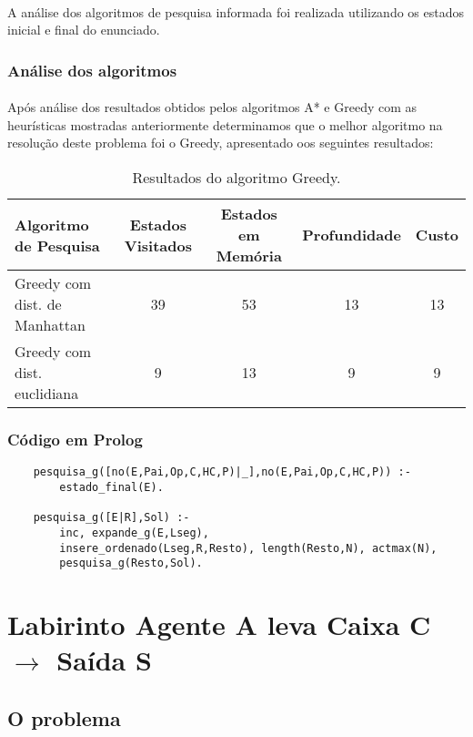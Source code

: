 \documentclass{article}
\begin{document}
\paragraph{} A análise dos algoritmos de pesquisa informada foi realizada utilizando os estados inicial e final do enunciado.

\subsubsection{Análise dos algoritmos}
\paragraph{} Após análise dos resultados obtidos pelos algoritmos A* e Greedy com as heurísticas mostradas anteriormente determinamos que o melhor algoritmo na resolução deste problema foi o Greedy, apresentado oos seguintes resultados:

\begin{table}[H]
\centering
\begin{tabular}{l|c|c|c|c}
Algoritmo de Pesquisa & Estados Visitados & Estados em Memória & Profundidade & Custo \\\hline
Greedy com dist. de Manhattan & 39 & 53 & 13 & 13 \\\hline
Greedy com dist. euclidiana & 9 & 13 & 9 & 9 
\end{tabular}
\caption{\label{tab:pni}Resultados do algoritmo Greedy.}
\end{table}

\subsubsection{Código em Prolog}
\begin{verbatim}
    pesquisa_g([no(E,Pai,Op,C,HC,P)|_],no(E,Pai,Op,C,HC,P)) :-        
        estado_final(E).
        
    pesquisa_g([E|R],Sol) :- 
        inc, expande_g(E,Lseg),
        insere_ordenado(Lseg,R,Resto), length(Resto,N), actmax(N),
        pesquisa_g(Resto,Sol).
\end{verbatim}

\newpage

\section{Labirinto Agente A leva Caixa C $\rightarrow$ Saída S}
\subsection{O problema}
\end{document}
